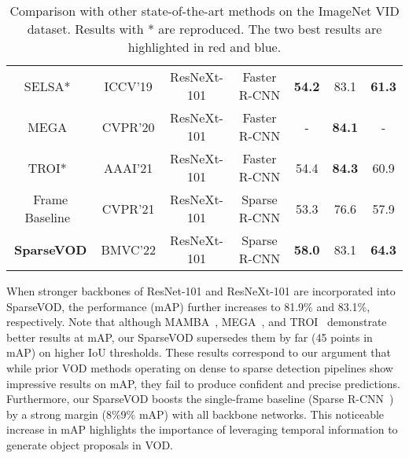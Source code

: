 \documentclass{bmvc2k}
\begin{document}
\begin{table}
\begin{center}
\begin{tabular}{ccccccc}
SELSA*~\cite{wu2019sequence}  & ICCV'19 & ResNeXt-101 & Faster R-CNN& \textbf{\color{blue}  54.2} & 83.1 &  \textbf{\color{blue} 61.3}  \\
MEGA~\cite{chen2020memory}  & CVPR'20 & ResNeXt-101 & Faster R-CNN  & - & \textbf{\color{blue}84.1}& -\\
TROI*~\cite{gong2021temporal}  & AAAI'21 & ResNeXt-101 & Faster R-CNN  & 54.4 & \textbf{\color{red} 84.3} & 60.9\\
\hline
{Frame Baseline~\cite{sun2021sparse}}& CVPR'21 & ResNeXt-101 & Sparse R-CNN & 53.3 & 76.6 & 57.9 \\
{\textbf{SparseVOD} }& BMVC'22 & ResNeXt-101 & Sparse R-CNN  & \textbf{\color{red}58.0} & 83.1 & \textbf{\color{red}64.3}\\
\bottomrule
\end{tabular}
\end{center}
\caption{Comparison with other state-of-the-art methods on the ImageNet VID dataset. Results with * are reproduced. The two best results are highlighted in red and blue.}
\label{table:sota_comparison}
\vspace{-20pt}
\end{table}

When stronger backbones of ResNet-101 and ResNeXt-101 are incorporated into SparseVOD, the performance (mAP) further increases to 81.9\% and 83.1\%, respectively. Note that although MAMBA~\cite{sun2021mamba}, MEGA~\cite{chen2020memory}, and TROI~\cite{gong2021temporal} demonstrate better results at mAP, our SparseVOD supersedes them by far (45 points in mAP) on higher IoU thresholds. These results correspond to our argument that while prior VOD methods operating on dense to sparse detection pipelines show impressive results on mAP, they fail to produce confident and precise predictions. Furthermore, our SparseVOD boosts the single-frame baseline (Sparse R-CNN~\cite{sun2021sparse}) by a strong margin (8\%9\% mAP) with all backbone networks. This noticeable increase in mAP highlights the importance of leveraging temporal information to generate object proposals in VOD.
\vspace{-5pt}
\end{document}
